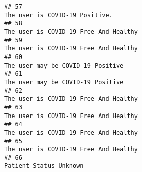 \documentclass[
]{article}
\begin{document}
\begin{verbatim}
## 57                                                                                                                                                                                                                                      The user is COVID-19 Positive.
## 58                                                                                                                                                                                                                               The user is COVID-19 Free And Healthy
## 59                                                                                                                                                                                                                               The user is COVID-19 Free And Healthy
## 60                                                                                                                                                                                                                                   The user may be COVID-19 Positive
## 61                                                                                                                                                                                                                                   The user may be COVID-19 Positive
## 62                                                                                                                                                                                                                               The user is COVID-19 Free And Healthy
## 63                                                                                                                                                                                                                               The user is COVID-19 Free And Healthy
## 64                                                                                                                                                                                                                               The user is COVID-19 Free And Healthy
## 65                                                                                                                                                                                                                               The user is COVID-19 Free And Healthy
## 66                                                                                                                                                                                                                                              Patient Status Unknown

\end{verbatim}
\end{document}
